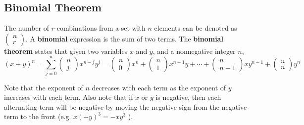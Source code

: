 \subsection{Binomial Theorem}
The number of \( r \)-combinations from a set with \( n \) elements can be denoted as
\( (\begin{smallmatrix}
	n \\
	r
\end{smallmatrix}) \).
A \textbf{binomial} expression is the sum of two terms. The \textbf{binomial theorem} states that given two variables \( x \) and \( y \), and a nonnegative integer \( n \),
\[
(x + y)^n = \sum_{j=0}^n \begin{pmatrix} n\\j \end{pmatrix} x^{n-j}y^j = 	\begin{pmatrix} n\\0 \end{pmatrix}x^n + \begin{pmatrix} n\\1 \end{pmatrix} x^{n-1}y+ \cdots + \begin{pmatrix} n\\n-1 \end{pmatrix}xy^{n-1}+ \begin{pmatrix} n\\n \end{pmatrix}y^n
\] 

Note that the exponent of \( n \) decreases with each term as the exponent of \( y \) increases with each term. Also note that if \( x \) or \( y \) is negative, then each alternating term will be negative by moving the negative sign from the negative term to the front (e.g. \( x(-y)^3 =  - xy^3  \) ).